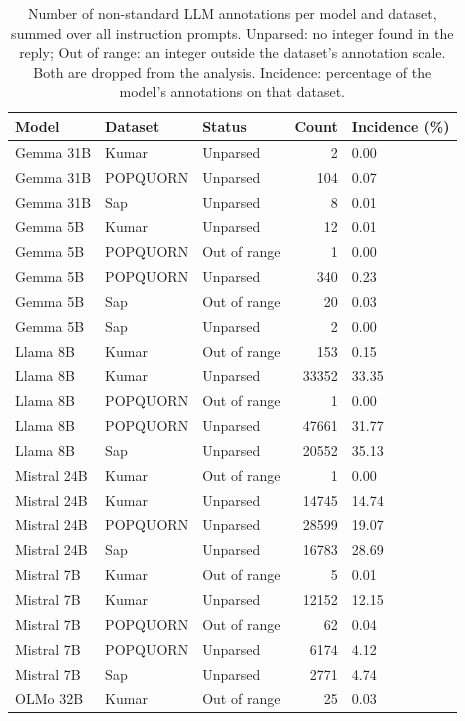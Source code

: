 \begin{table}[htbp]
\small
\centering
\caption{Number of non-standard LLM annotations per model and dataset, summed over all instruction prompts. Unparsed: no integer found in the reply; Out of range: an integer outside the dataset's annotation scale. Both are dropped from the analysis. Incidence: percentage of the model's annotations on that dataset.}
\label{tab:nonstandard-answers}
\begin{tabular}{lllrl}
\toprule
Model & Dataset & Status & Count & Incidence (\%) \\
\midrule
Gemma 31B & Kumar & Unparsed & 2 & 0.00 \\
Gemma 31B & POPQUORN & Unparsed & 104 & 0.07 \\
Gemma 31B & Sap & Unparsed & 8 & 0.01 \\
Gemma 5B & Kumar & Unparsed & 12 & 0.01 \\
Gemma 5B & POPQUORN & Out of range & 1 & 0.00 \\
Gemma 5B & POPQUORN & Unparsed & 340 & 0.23 \\
Gemma 5B & Sap & Out of range & 20 & 0.03 \\
Gemma 5B & Sap & Unparsed & 2 & 0.00 \\
Llama 8B & Kumar & Out of range & 153 & 0.15 \\
Llama 8B & Kumar & Unparsed & 33352 & 33.35 \\
Llama 8B & POPQUORN & Out of range & 1 & 0.00 \\
Llama 8B & POPQUORN & Unparsed & 47661 & 31.77 \\
Llama 8B & Sap & Unparsed & 20552 & 35.13 \\
Mistral 24B & Kumar & Out of range & 1 & 0.00 \\
Mistral 24B & Kumar & Unparsed & 14745 & 14.74 \\
Mistral 24B & POPQUORN & Unparsed & 28599 & 19.07 \\
Mistral 24B & Sap & Unparsed & 16783 & 28.69 \\
Mistral 7B & Kumar & Out of range & 5 & 0.01 \\
Mistral 7B & Kumar & Unparsed & 12152 & 12.15 \\
Mistral 7B & POPQUORN & Out of range & 62 & 0.04 \\
Mistral 7B & POPQUORN & Unparsed & 6174 & 4.12 \\
Mistral 7B & Sap & Unparsed & 2771 & 4.74 \\
OLMo 32B & Kumar & Out of range & 25 & 0.03 \\

\end{tabular}
\end{table}
